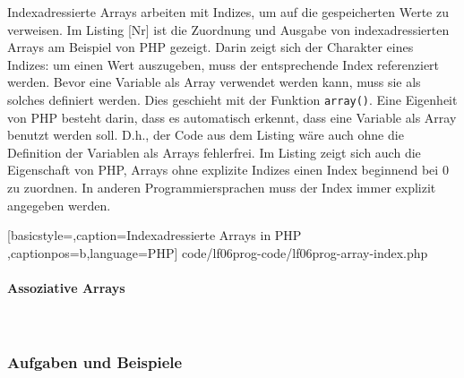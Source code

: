 Indexadressierte Arrays arbeiten mit Indizes, um auf die gespeicherten Werte zu verweisen. Im Listing [Nr] ist die Zuordnung und Ausgabe von indexadressierten Arrays am Beispiel von PHP gezeigt. Darin zeigt sich der Charakter eines Indizes: um einen Wert auszugeben, muss der entsprechende Index referenziert werden. Bevor eine Variable als Array verwendet werden kann, muss sie als solches definiert werden. Dies geschieht mit der Funktion \texttt{array()}. Eine Eigenheit von PHP besteht darin, dass es automatisch erkennt, dass eine Variable als Array benutzt werden soll. D.h., der Code aus dem Listing wäre auch ohne die Definition der Variablen als Arrays fehlerfrei. Im Listing zeigt sich auch die Eigenschaft von PHP, Arrays ohne explizite Indizes einen Index beginnend bei $0$ zu zuordnen. In anderen Programmiersprachen muss der Index immer explizit angegeben werden.


	[basicstyle=\small,caption={Indexadressierte Arrays in PHP}
	\label{lst:Switch-Case},captionpos=b,language=PHP]
	{code/lf06prog-code/lf06prog-array-index.php}

\paragraph{Assoziative Arrays}~\\


\subsubsection{Aufgaben und Beispiele}